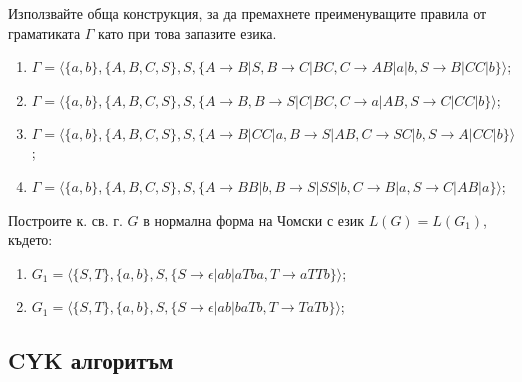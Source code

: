 \begin{problem}
Използвайте обща конструкция, за да премахнете преименуващите правила от граматиката $\Gamma$ като при това запазите езика.

\begin{enumerate}
\item
$\Gamma=\langle\{a,b\},\{A,B,C,S\},S,\{A\rightarrow B|S,B\rightarrow C|BC,C\rightarrow AB|a|b,S\rightarrow B|CC|b\}\rangle$;
\item
$\Gamma=\langle\{a,b\},\{A,B,C,S\},S,\{A\rightarrow B,B\rightarrow S|C|BC,C\rightarrow a|AB,S\rightarrow C|CC|b\}\rangle$;
\item
$\Gamma=\langle\{a,b\},\{A,B,C,S\},S,\{A\rightarrow B|CC|a,B\rightarrow S|AB,C\rightarrow SC|b,S\rightarrow A|CC|b\}\rangle$;
\item
$\Gamma=\langle\{a,b\},\{A,B,C,S\},S,\{A\rightarrow BB|b,B\rightarrow S|SS|b,C\rightarrow B|a,S\rightarrow C|AB|a\}\rangle$;
\end{enumerate}
\end{problem}

\begin{problem}
Построите к. св. г. $G$ в нормална форма на Чомски с език $L(G) = L(G_1)$, където:
\begin{enumerate}
\item
$G_1=\langle\{S,T\},\{a,b\},S,\{S \rightarrow \epsilon|ab|aTba,T\rightarrow aTTb\}\rangle$;
\item
$G_1=\langle\{S,T\},\{a,b\},S,\{S \rightarrow \epsilon|ab|baTb,T\rightarrow TaTb\}\rangle$;
\end{enumerate}
\end{problem}


\subsection{CYK алгоритъм}

